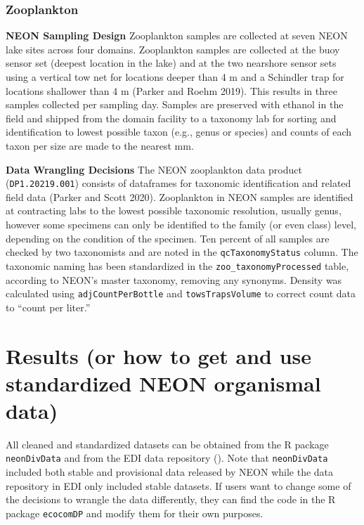 \documentclass[
  12pt,
]{article}
\begin{document}
\hypertarget{zooplankton}{%
\subsubsection{Zooplankton}\label{zooplankton}}

\textbf{NEON Sampling Design} Zooplankton samples are collected at seven NEON lake sites across four domains. Zooplankton samples are collected at the buoy sensor set (deepest location in the lake) and at the two nearshore sensor sets using a vertical tow net for locations deeper than 4 m and a Schindler trap for locations shallower than 4 m (Parker and Roehm 2019). This results in three samples collected per sampling day. Samples are preserved with ethanol in the field and shipped from the domain facility to a taxonomy lab for sorting and identification to lowest possible taxon (e.g., genus or species) and counts of each taxon per size are made to the nearest mm.

\textbf{Data Wrangling Decisions} The NEON zooplankton data product (\texttt{DP1.20219.001}) consists of dataframes for taxonomic identification and related field data (Parker and Scott 2020). Zooplankton in NEON samples are identified at contracting labs to the lowest possible taxonomic resolution, usually genus, however some specimens can only be identified to the family (or even class) level, depending on the condition of the specimen. Ten percent of all samples are checked by two taxonomists and are noted in the \texttt{qcTaxonomyStatus} column. The taxonomic naming has been standardized in the \texttt{zoo\_taxonomyProcessed} table, according to NEON's master taxonomy, removing any synonyms. Density was calculated using \texttt{adjCountPerBottle} and \texttt{towsTrapsVolume} to correct count data to ``count per liter.''

\hypertarget{results-or-how-to-get-and-use-standardized-neon-organismal-data}{%
\section{Results (or how to get and use standardized NEON organismal data)}\label{results-or-how-to-get-and-use-standardized-neon-organismal-data}}

All cleaned and standardized datasets can be obtained from the R package \texttt{neonDivData} and from the EDI data repository (). Note that \texttt{neonDivData} included both stable and provisional data released by NEON while the data repository in EDI only included stable datasets. If users want to change some of the decisions to wrangle the data differently, they can find the code in the R package \texttt{ecocomDP} and modify them for their own purposes.
\end{document}
